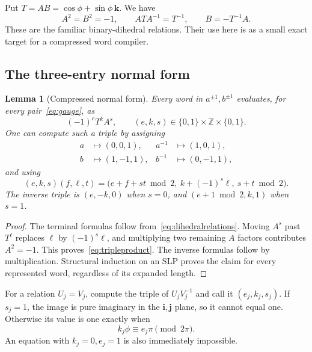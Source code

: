 \documentclass[11pt]{article}
\newtheorem{lemma}[theorem]{Lemma}
\theoremstyle{definition}
\theoremstyle{remark}
\newcommand{\ZZ}{\mathbb Z}
\begin{document}
Put $T=AB=\cos\phi+\sin\phi\,\mathbf k$. We have
\begin{equation}
A^2=B^2=-1,\qquad ATA^{-1}=T^{-1},\qquad B=-T^{-1}A.
\label{eq:dihedralrelations}
\end{equation}
These are the familiar binary-dihedral relations. Their use here is as a small exact target for a compressed word compiler.

\subsection{The three-entry normal form}
\begin{lemma}[Compressed normal form]
\label{lem:nf}
Every word in $a^{\pm1},b^{\pm1}$ evaluates, for every pair~\eqref{eq:gauge}, as
\begin{equation}
(-1)^e T^k A^s,\qquad (e,k,s)\in\{0,1\}\times\ZZ\times\{0,1\}.
\label{eq:nf}
\end{equation}
One can compute such a triple by assigning
\begin{align*}
a&\mapsto(0,0,1),&a^{-1}&\mapsto(1,0,1),\\
b&\mapsto(1,-1,1),&b^{-1}&\mapsto(0,-1,1),
\end{align*}
and using
\begin{equation}
(e,k,s)(f,\ell,t)=
\bigl(e+f+st\bmod2,\ k+(-1)^s\ell,\ s+t\bmod2\bigr).
\label{eq:tripleproduct}
\end{equation}
The inverse triple is $(e,-k,0)$ when $s=0$, and $(e+1\bmod2,k,1)$ when $s=1$.
\end{lemma}
\begin{proof}
The terminal formulas follow from~\eqref{eq:dihedralrelations}. Moving $A^s$ past $T^\ell$ replaces $\ell$ by $(-1)^s\ell$, and multiplying two remaining $A$ factors contributes $A^2=-1$. This proves~\eqref{eq:tripleproduct}. The inverse formulas follow by multiplication. Structural induction on an SLP proves the claim for every represented word, regardless of its expanded length.
\end{proof}

For a relation $U_j=V_j$, compute the triple of $U_jV_j^{-1}$ and call it $(e_j,k_j,s_j)$. If $s_j=1$, the image is pure imaginary in the $\mathbf i,\mathbf j$ plane, so it cannot equal one. Otherwise its value is one exactly when
\begin{equation}
k_j\phi\equiv e_j\pi\pmod{2\pi}.
\label{eq:congruences}
\end{equation}
An equation with $k_j=0,e_j=1$ is also immediately impossible.
\end{document}
